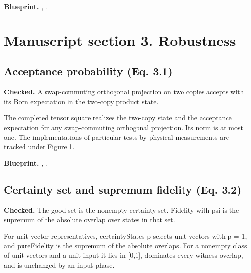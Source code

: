 \textbf{Blueprint.} , .

\section{Manuscript section 3. Robustness}
\subsection{Acceptance probability (Eq. 3.1)}\label{paper:acceptance}
\textbf{Checked.} A swap-commuting orthogonal projection on two copies accepts with its Born expectation in the two-copy product state. 

The completed tensor square realizes the two-copy state and the acceptance expectation for any swap-commuting orthogonal projection. Its norm is at most one. The implementations of particular tests by physical measurements are tracked under Figure 1.


\textbf{Blueprint.} , .

\subsection{Certainty set and supremum fidelity (Eq. 3.2)}\label{paper:fidelity}
\textbf{Checked.} The good set is the nonempty certainty set. Fidelity with psi is the supremum of the absolute overlap over states in that set. 

For unit-vector representatives, certaintyStates p selects unit vectors with p = 1, and pureFidelity is the supremum of the absolute overlaps. For a nonempty class of unit vectors and a unit input it lies in [0,1], dominates every witness overlap, and is unchanged by an input phase.

